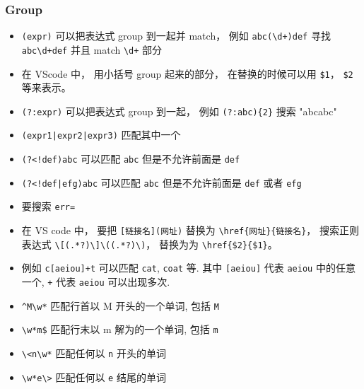 \subsubsection{Group}
\begin{itemize}
\item \verb|(expr)| 可以把表达式 group 到一起并 match， 例如 \verb|abc(\d+)def| 寻找 \verb|abc\d+def| 并且 match \verb|\d+| 部分
\item 在 VScode 中， 用小括号 group 起来的部分， 在替换的时候可以用 \verb|$1|， \verb|$2| 等来表示。
\item \verb|(?:expr)| 可以把表达式 group 到一起， 例如 \verb|(?:abc){2}| 搜索 "abcabc"
\item \verb`(expr1|expr2|expr3)` 匹配其中一个
\item \verb`(?<!def)abc` 可以匹配 \verb|abc| 但是不允许前面是 \verb|def|
\item \verb`(?<!def|efg)abc` 可以匹配 \verb|abc| 但是不允许前面是 \verb|def| 或者 \verb|efg|
\end{itemize}

\begin{example}{}
\begin{itemize}
\item 要搜索 \verb|err=|
\item 在 VS code 中， 要把 \verb|[链接名](网址)| 替换为 \verb|\href{网址}{链接名}|， 搜索正则表达式 \verb|\[(.*?)\]\((.*?)\)|， 替换为为 \verb|\href{$2}{$1}|。
\item 例如 \verb`c[aeiou]+t` 可以匹配 \verb`cat`, \verb`coat` 等. 其中 \verb`[aeiou]` 代表 \verb`aeiou` 中的任意一个, \verb`+` 代表 \verb`aeiou` 可以出现多次.
\item \verb`^M\w*` 匹配行首以 M 开头的一个单词, 包括 \verb`M`
\item \verb`\w*m$` 匹配行末以 m 解为的一个单词, 包括 \verb`m`
\item \verb`\<n\w*` 匹配任何以 \verb`n` 开头的单词
\item \verb`\w*e\>` 匹配任何以 \verb`e` 结尾的单词
\end{itemize}
\end{example}
